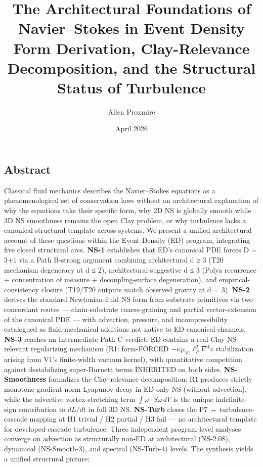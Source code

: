 \documentclass[
  11pt,a4paper]{article}
\title{The Architectural Foundations of Navier--Stokes in Event
Density\\
\large Form Derivation, Clay-Relevance Decomposition, and the Structural
Status of Turbulence}
\author{Allen Proxmire}
\date{April 2026}
\begin{document}
\maketitle

\subsection{Abstract}\label{abstract}

Classical fluid mechanics describes the Navier--Stokes equations as a
phenomenological set of conservation laws without an architectural
explanation of why the equations take their specific form, why 2D NS is
globally smooth while 3D NS smoothness remains the open Clay problem, or
why turbulence lacks a canonical structural template across systems. We
present a unified architectural account of these questions within the
Event Density (ED) program, integrating five closed structural arcs.
\textbf{NS-1} establishes that ED's canonical PDE forces D = 3+1 via a
Path B-strong argument combining architectural d ≥ 3 (T20 mechanism
degeneracy at d ≤ 2), architectural-suggestive d ≤ 3 (Polya recurrence +
concentration of measure + decoupling-surface degeneration), and
empirical-consistency closure (T19/T20 outputs match observed gravity at
d = 3). \textbf{NS-2} derives the standard Newtonian-fluid NS form from
substrate primitives via two concordant routes --- chain-substrate
coarse-graining and partial vector-extension of the canonical PDE ---
with advection, pressure, and incompressibility catalogued as
fluid-mechanical additions not native to ED canonical channels.
\textbf{NS-3} reaches an Intermediate Path C verdict: ED contains a real
Clay-NS-relevant regularizing mechanism (R1: form-FORCED
\(-\kappa\mu_{V1}\ell_P^2 \nabla^4 v\) stabilization arising from V1's
finite-width vacuum kernel), with quantitative competition against
destabilizing super-Burnett terms INHERITED on both sides.
\textbf{NS-Smoothness} formalizes the Clay-relevance decomposition: R1
produces strictly monotone gradient-norm Lyapunov decay in ED-only NS
(without advection), while the advective vortex-stretching term
\(\int\omega\cdot S\omega\,dV\) is the unique indefinite-sign
contribution to \(dL/dt\) in full 3D NS. \textbf{NS-Turb} closes the P7
↔ turbulence-cascade mapping at H1 trivial / H2 partial / H3 fail --- no
architectural template for developed-cascade turbulence. Three
independent program-level analyses converge on advection as structurally
non-ED at architectural (NS-2.08), dynamical (NS-Smooth-3), and spectral
(NS-Turb-4) levels. The synthesis yields a unified structural picture:
\end{document}
